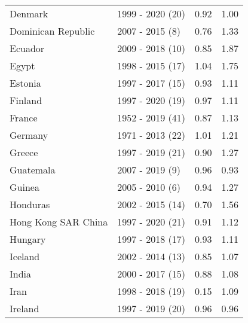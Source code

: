 \begin{table}[H]
{{\begin{tabular}{llrr}
\addlinespace
Denmark & 1999 - 2020 (20) & 0.92 & 1.00\\
Dominican Republic & 2007 - 2015 (8) & 0.76 & 1.33\\
Ecuador & 2009 - 2018 (10) & 0.85 & 1.87\\
Egypt & 1998 - 2015 (17) & 1.04 & 1.75\\
Estonia & 1997 - 2017 (15) & 0.93 & 1.11\\
\addlinespace
Finland & 1997 - 2020 (19) & 0.97 & 1.11\\
France & 1952 - 2019 (41) & 0.87 & 1.13\\
Germany & 1971 - 2013 (22) & 1.01 & 1.21\\
Greece & 1997 - 2019 (21) & 0.90 & 1.27\\
Guatemala & 2007 - 2019 (9) & 0.96 & 0.93\\
\addlinespace
Guinea & 2005 - 2010 (6) & 0.94 & 1.27\\
Honduras & 2002 - 2015 (14) & 0.70 & 1.56\\
Hong Kong SAR China & 1997 - 2020 (21) & 0.91 & 1.12\\
Hungary & 1997 - 2018 (17) & 0.93 & 1.11\\
Iceland & 2002 - 2014 (13) & 0.85 & 1.07\\
\addlinespace
India & 2000 - 2017 (15) & 0.88 & 1.08\\
Iran & 1998 - 2018 (19) & 0.15 & 1.09\\
Ireland & 1997 - 2019 (20) & 0.96 & 0.96\\
\bottomrule
\end{tabular}
}

}
\end{table}
